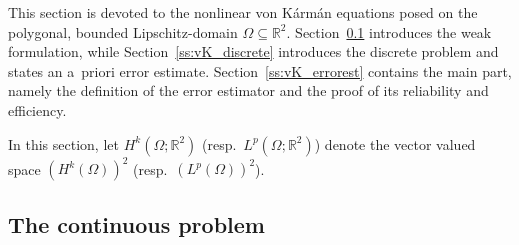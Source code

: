 \documentclass[a4paper]{amsart}
\theoremstyle{definition}
\numberwithin{equation}{section}
\numberwithin{theorem}{section}
\newcommand{\R}{\mathbb{R}}
\begin{document}
This section is devoted to the nonlinear von K\'arm\'an equations 
posed on the polygonal, bounded Lipschitz-domain $\Omega\subseteq \R^2$.
Section~\ref{ss:vK_cont} introduces the weak formulation, 
while Section~\ref{ss:vK_discrete} introduces the discrete 
problem and states an a~priori error estimate.
Section~\ref{ss:vK_errorest} contains the main part, namely the 
definition of the error estimator and the proof of its 
reliability and efficiency.

In this section, let $H^k(\Omega;\R^2)$ (resp.\ $L^p(\Omega;\R^2)$)
denote the vector valued space $(H^k(\Omega))^2$
(resp.\ $(L^p(\Omega))^2$).

\subsection{The continuous problem}\label{ss:vK_cont}
\end{document}
